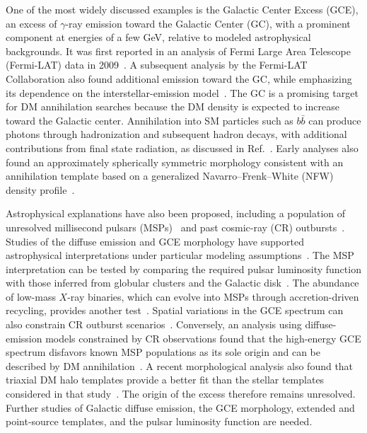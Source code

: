 \documentclass[superscriptaddress,
showpacs,preprintnumbers,nofootinbib,eqsecnum,amsmath,amssymb,aps,11pt, groupedaddress, floatfix]{revtex4-2}
\begin{document}
One of the most widely discussed examples is the Galactic Center
Excess (GCE), an excess of $\gamma$-ray emission toward the Galactic
Center (GC), with a prominent component at energies of a few GeV,
relative to modeled astrophysical backgrounds.
It was first reported in an analysis of Fermi Large Area Telescope
(Fermi-LAT) data in 2009~\cite{Goodenough:2009gk}.
A subsequent analysis by the Fermi-LAT Collaboration also found
additional emission toward the GC, while emphasizing its
dependence on the interstellar-emission
model~\cite{Fermi-LAT:2015sau}.
The GC is a promising target for DM annihilation searches because the DM density is expected to increase toward the Galactic center.
Annihilation into SM particles such as $b\bar b$ can produce photons through hadronization and subsequent hadron decays, with additional contributions from final state radiation, as discussed
in Ref.~\cite{Goodenough:2009gk}. 
Early analyses also found an approximately spherically symmetric
morphology consistent with an annihilation template based on a
generalized Navarro--Frenk--White (NFW) density profile~\cite{Daylan:2014rsa}.

Astrophysical explanations have also been proposed, including a
population of unresolved millisecond pulsars (MSPs)~\cite{Abazajian:2010zy} and past cosmic-ray (CR)
outbursts~\cite{Carlson:2014cwa}.
Studies of the diffuse emission and GCE morphology have supported
astrophysical interpretations under particular modeling
assumptions~\cite{Bartels:2017vsx,Ploeg:2020jeh,Manconi:2024tgh}.
The MSP interpretation can be tested by comparing the required
pulsar luminosity function with those inferred from globular
clusters and the Galactic
disk~\cite{Hooper:2013nhl,Zhong:2019ycb,Dinsmore:2021nip}.
The abundance of low-mass $X$-ray binaries, which can evolve into
MSPs through accretion-driven recycling, provides another
test~\cite{Zhong:2019ycb,Abazajian:2012pn}.
Spatial variations in the GCE spectrum can also constrain CR
outburst scenarios~\cite{Carlson:2014cwa,Calore:2014xka}.
Conversely, an analysis using diffuse-emission models constrained
by CR observations found that the high-energy GCE spectrum
disfavors known MSP populations as its sole origin and can be
described by DM annihilation~\cite{Cholis:2021rpp}.
A recent morphological analysis also found that triaxial DM halo
templates provide a better fit than the stellar templates
considered in that study~\cite{Hu:2026apn}.
The origin of the excess therefore remains unresolved.
Further studies of Galactic diffuse emission, the GCE morphology,
extended and point-source templates, and the pulsar luminosity function are needed.
\end{document}
